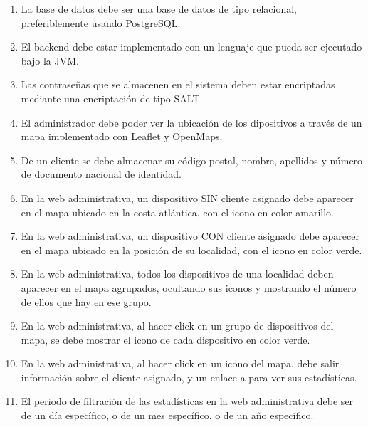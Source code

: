 \begin{enumerate}[label=NF\arabic* -]

    \item La base de datos debe ser una base de datos de tipo relacional, preferiblemente usando PostgreSQL.
    
    \item El backend debe estar implementado con un lenguaje que pueda ser ejecutado bajo la JVM.
    
    \item Las contraseñas que se almacenen en el sistema deben estar encriptadas mediante una encriptación de tipo SALT.
    
    \item El administrador debe poder ver la ubicación de los dipositivos a través de un mapa implementado con Leaflet y OpenMaps.
    
    \item De un cliente se debe almacenar su código postal, nombre, apellidos y número de documento nacional de identidad.
    
    \item En la web administrativa, un dispositivo SIN cliente asignado debe aparecer en el mapa ubicado en la costa atlántica, con el icono en color amarillo.
    
    \item En la web administrativa, un dispositivo CON cliente asignado debe aparecer en el mapa ubicado en la posición de su localidad, con el icono en color verde.
    
    \item En la web administrativa, todos los dispositivos de una localidad deben aparecer en el mapa agrupados, ocultando sus iconos y mostrando el número de ellos que hay en ese grupo.
    
    \item En la web administrativa, al hacer click en un grupo de dispositivos del mapa, se debe mostrar el icono de cada dispositivo en color verde.
    
    \item En la web administrativa, al hacer click en un icono del mapa, debe salir información sobre el cliente asignado, y un enlace a para ver sus estadísticas.
    
    \item El periodo de filtración de las estadísticas en la web administrativa debe ser de un día específico, o de un mes específico, o de un año específico.
    

\end{enumerate}
